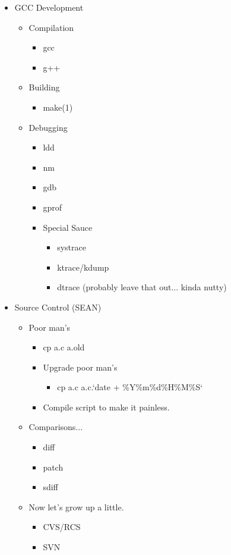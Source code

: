 \documentclass[12pt]{article}
\begin{document}
\begin{itemize}
\begin{itemize}
		
	\end {itemize} 
	\item GCC Development 
	\begin{itemize}
		\item Compilation 
		\begin{itemize}
			\item gcc 
			\item g++ 
		\end{itemize}
		\item Building 
		\begin{itemize}
			\item make(1) 
		\end{itemize}
		\item Debugging 
		\begin{itemize}
			\item ldd 
			\item nm 
			\item gdb 
			\item gprof 
			\item Special Sauce 
			\begin{itemize}
				\item systrace 
				\item ktrace/kdump 
				\item dtrace (probably leave that out... kinda nutty) 
			\end{itemize}
		\end{itemize}
		
		
	\end {itemize} 
	\item Source Control (SEAN)
	\begin{itemize}
		\item Poor man's 
		\begin{itemize}
			\item cp a.c a.old 
			\item Upgrade poor man's 
			\begin{itemize}
				\item cp a.c a.c.`date + \%Y\%m\%d\%H\%M\%S`
			\end{itemize}
			\item Compile script to make it painless. 
		\end{itemize}
		\item Comparisons... 
		\begin{itemize}
			\item diff 
			\item patch 
			\item sdiff 
		\end{itemize}
		\item Now let's grow up a little. 
		\begin{itemize}
			\item CVS/RCS 
			\item SVN 
		\end{itemize}
	\end{itemize}
	
	
\end {itemize}
\end{document}
